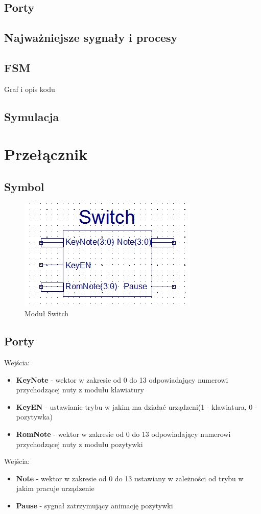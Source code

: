 \documentclass[a4paper]{report}
\begin{document}
		\subsection{Porty}
		\subsection{Najważniejsze sygnały i procesy}
		\subsection{FSM}
		Graf i opis kodu
		\subsection{Symulacja}
	\newpage
	\section{Przełącznik}
		\subsection{Symbol}	
			\begin{figure}[h!]
				\centering
				\includegraphics{switch2.png}
				\caption{Moduł Switch}
			\end{figure}
		\subsection{Porty}
			{\Large Wejścia:}
			\begin{itemize}	 
				\item \textbf{KeyNote} - wektor w zakresie od 0 do 13 odpowiadający numerowi przychodzącej nuty z modułu klawiatury
				\item \textbf{KeyEN} - ustawianie trybu w jakim ma działać urządzeni(1 - klawiatura, 0 - pozytywka)
				\item \textbf{RomNote} - wektor w zakresie od 0 do 13 odpowiadający numerowi przychodzącej nuty z modułu pozytywki
			\end{itemize}
		{\Large Wejścia:}
			\begin{itemize} 
				\item \textbf{Note} - wektor w zakresie od 0 do 13 ustawiany w zależności od trybu w jakim pracuje urządzenie
				\item \textbf{Pause} - sygnał zatrzymujący animację pozytywki
			\end{itemize}
\end{document}
